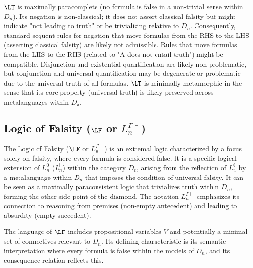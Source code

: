 																																											\begin{remark}[Properties of $\LT$]
																																												$\LT$ is maximally paracomplete (no formula is false in a non-trivial sense within $D_n$). Its negation is non-classical; it does not assert classical falsity but might indicate "not leading to truth" or be trivializing relative to $D_n$. Consequently, standard sequent rules for negation that move formulas from the RHS to the LHS (asserting classical falsity) are likely not admissible. Rules that move formulas from the LHS to the RHS (related to "A does not entail truth") might be compatible. Disjunction and existential quantification are likely non-problematic, but conjunction and universal quantification may be degenerate or problematic due to the universal truth of all formulas. $\LT$ is minimally metamorphic in the sense that its core property (universal truth) is likely preserved across metalanguages within $D_n$.
																																												\end{remark}
																																													
																																													\subsection{Logic of Falsity ($\LF$ or $L^{\Gamma\vdash}_n$)}
																																													
																																													The Logic of Falsity ($\LF$ or $L^{\Gamma\vdash}_n$) is an extremal logic characterized by a focus solely on falsity, where every formula is considered false. It is a specific logical extension of $L^0_n$ ($L^{\vdash}_n$) within the category $D_n$, arising from the reflection of $L^0_n$ by a metalanguage within $D_n$ that imposes the condition of universal falsity. It can be seen as a maximally paraconsistent logic that trivializes truth within $D_n$, forming the other side point of the diamond. The notation $L^{\Gamma\vdash}_n$ emphasizes its connection to reasoning from premises (non-empty antecedent) and leading to absurdity (empty succedent).
																																													
																																													\begin{definition}[Language of $\LF$]
																																														The language of $\LF$ includes propositional variables $V$ and potentially a minimal set of connectives relevant to $D_n$. Its defining characteristic is its semantic interpretation where every formula is false within the models of $D_n$, and its consequence relation reflects this.
																																														\end{definition}
																																															
